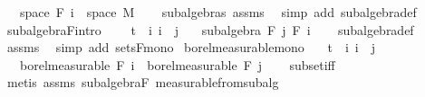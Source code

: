 \begin{isabellebody}
\ \ \ {\isachardoublequoteopen}space\ {\isacharparenleft}{\kern0pt}F\ i{\isacharparenright}{\kern0pt}\ {\isacharequal}{\kern0pt}\ space\ M{\isachardoublequoteclose}\isanewline
%
\isadelimproof
\ \ %
\endisadelimproof
%
\isatagproof
{}\isamarkupfalse%
\ subalgebras\ assms\ \isamarkupfalse%
\ {\isacharparenleft}{\kern0pt}simp\ add{\isacharcolon}{\kern0pt}\ subalgebra{\isacharunderscore}{\kern0pt}def{\isacharparenright}{\kern0pt}%
\endisatagproof
{\isafoldproof}%
%
\isadelimproof
\isanewline
%
\endisadelimproof
\isanewline
{}\isamarkupfalse%
\ subalgebra{\isacharunderscore}{\kern0pt}F{\isacharbrackleft}{\kern0pt}intro{\isacharbrackright}{\kern0pt}{\isacharcolon}{\kern0pt}\ \isanewline
\ \ \ {\isachardoublequoteopen}t\ {\isasymle}\ i{\isachardoublequoteclose}\ {\isachardoublequoteopen}i\ {\isasymle}\ j{\isachardoublequoteclose}\isanewline
\ \ \ {\isachardoublequoteopen}subalgebra\ {\isacharparenleft}{\kern0pt}F\ j{\isacharparenright}{\kern0pt}\ {\isacharparenleft}{\kern0pt}F\ i{\isacharparenright}{\kern0pt}{\isachardoublequoteclose}\isanewline
%
\isadelimproof
\ \ %
\endisadelimproof
%
\isatagproof
{}\isamarkupfalse%
\ subalgebra{\isacharunderscore}{\kern0pt}def\ \isamarkupfalse%
\ assms\ \isamarkupfalse%
\ {\isacharparenleft}{\kern0pt}simp\ add{\isacharcolon}{\kern0pt}\ sets{\isacharunderscore}{\kern0pt}F{\isacharunderscore}{\kern0pt}mono{\isacharparenright}{\kern0pt}%
\endisatagproof
{\isafoldproof}%
%
\isadelimproof
\isanewline
%
\endisadelimproof
\isanewline
{}\isamarkupfalse%
\ borel{\isacharunderscore}{\kern0pt}measurable{\isacharunderscore}{\kern0pt}mono{\isacharcolon}{\kern0pt}\isanewline
\ \ \ {\isachardoublequoteopen}t\ {\isasymle}\ i{\isachardoublequoteclose}\ {\isachardoublequoteopen}i\ {\isasymle}\ j{\isachardoublequoteclose}\isanewline
\ \ \ {\isachardoublequoteopen}borel{\isacharunderscore}{\kern0pt}measurable\ {\isacharparenleft}{\kern0pt}F\ i{\isacharparenright}{\kern0pt}\ {\isasymsubseteq}\ borel{\isacharunderscore}{\kern0pt}measurable\ {\isacharparenleft}{\kern0pt}F\ j{\isacharparenright}{\kern0pt}{\isachardoublequoteclose}\isanewline
%
\isadelimproof
\ \ %
\endisadelimproof
%
\isatagproof
{}\isamarkupfalse%
\ subset{\isacharunderscore}{\kern0pt}iff\ \isamarkupfalse%
\ {\isacharparenleft}{\kern0pt}metis\ assms\ subalgebra{\isacharunderscore}{\kern0pt}F\ measurable{\isacharunderscore}{\kern0pt}from{\isacharunderscore}{\kern0pt}subalg{\isacharparenright}{\kern0pt}%

\end{isabellebody}
